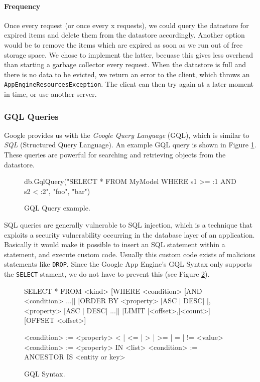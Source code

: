 \paragraph{Frequency}
Once every request (or once every x requests), we could query the datastore for
expired items and delete them from the datastore accordingly. Another option
would be to remove the items which are expired as soon as we run out of free
storage space. We chose to implement the latter, becuase this gives less
overhead than starting a garbage collector every request. When the datastore is
full and there is no data to be evicted, we return an error to the client, which
throws an \texttt{AppEngineResourcesException}. The client can then try again at
a later moment in time, or use another server.

\subsubsection{GQL Queries}
\label{serverdesign-gql}
Google provides us with the \emph{Google Query Language} (GQL), which is similar
to \emph{SQL} (Structured Query Language). An example GQL query is shown in
Figure \ref{serverdesign-gql-example}. These queries are powerful for searching and
retrieving objects from the datastore. 

\begin{figure}[ht] %
\begin{center}
\begin{code}
db.GqlQuery("SELECT * FROM MyModel WHERE s1 >= :1 AND s2 < :2", "foo", "bar")
\end{code}
\caption{GQL Query example.\label{serverdesign-gql-example}}
\end{center}
\end{figure}

SQL queries are generally vulnerable to SQL injection,
which is a technique that exploits a security vulnerability occurring in the
database layer of an application. Basically it would make it possible to insert
an SQL statement within a statement, and execute custom code. Usually this
custom code exists of malicious statements like \texttt{DROP}. Since the Google
App Engine's GQL Syntax only supports the \texttt{SELECT} stament, we do not
have to prevent this (see Figure \ref{serverdesign-gql-syntax}).

\begin{figure}[ht] %
\begin{center}
\begin{code}
  SELECT * FROM <kind>
    [WHERE <condition> [AND <condition> ...]]
    [ORDER BY <property> [ASC | DESC] [, <property> [ASC | DESC] ...]]
    [LIMIT [<offset>,]<count>]
    [OFFSET <offset>]

  <condition> := <property> {< | <= | > | >= | = | != } <value>
  <condition> := <property> IN <list>
  <condition> := ANCESTOR IS <entity or key>
\end{code}
\caption{GQL Syntax.\label{serverdesign-gql-syntax}}
\end{center}
\end{figure}

